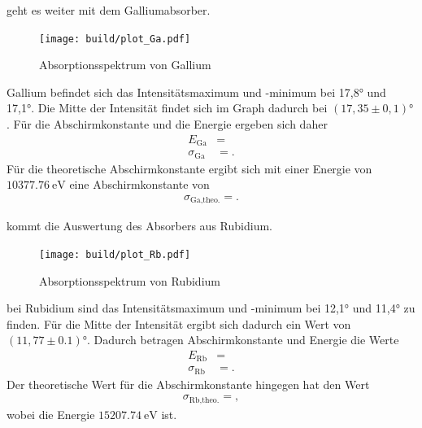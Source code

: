 \justifying geht es weiter mit dem Galliumabsorber.


\begin{figure}[H]
    \centering
    \texttt{[image: build/plot\_Ga.pdf]}
    \caption{Absorptionsspektrum von Gallium\cite{matplotlib}}
    \label{fig:5}
\end{figure}

\justifying Gallium befindet sich das Intensitätsmaximum und -minimum
bei 17,8° und 17,1°. Die Mitte der Intensität
findet sich im Graph dadurch bei $(17,35\pm 0,1)°$.
Für die Abschirmkonstante und die Energie ergeben sich daher
\begin{align}
    E_{\text{Ga}}&= \text{} \label{eq:30}\\
    \sigma _{\text{Ga}} &= \text{} \label{eq:31}.
\end{align}
Für die theoretische Abschirmkonstante ergibt sich 
mit einer Energie von $\SI{10377.76}{\electronvolt} $ \cite{NIST} eine 
Abschirmkonstante von
\begin{align}
    \sigma _{\text{Ga,theo.}} = \text{} \label{eq:32}.
\end{align}


\justifying kommt die Auswertung des Absorbers aus Rubidium.


\begin{figure}[H]
    \centering
    \texttt{[image: build/plot\_Rb.pdf]}
    \caption{Absorptionsspektrum von Rubidium\cite{matplotlib}}
    \label{fig:6}
\end{figure}

\justifying bei Rubidium sind das Intensitätsmaximum und -minimum bei 12,1° und 11,4° zu finden.
Für die Mitte der Intensität ergibt sich dadurch ein Wert von $(11,77 \pm 0.1)° $.
Dadurch betragen Abschirmkonstante und Energie die Werte
\begin{align}
    E_{\text{Rb}}&= \text{} \label{eq:33}\\
    \sigma _{\text{Rb}} &= \text{} \label{eq:34}.
\end{align}
Der theoretische Wert für die Abschirmkonstante hingegen hat den Wert
\begin{align}
    \sigma _{\text{Rb,theo.}}=\text{} \label{eq:35},
\end{align}
wobei die Energie $\SI{15207.74}{\electronvolt}$ \cite{NIST} ist.

